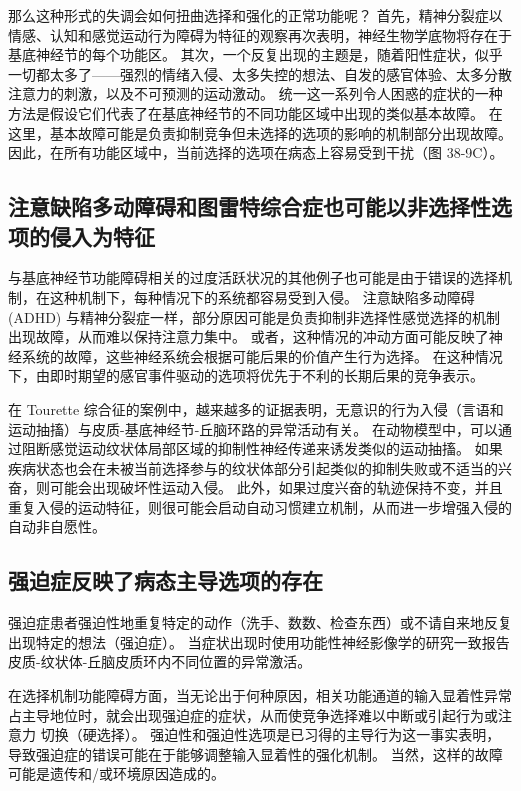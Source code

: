 那么这种形式的失调会如何扭曲选择和强化的正常功能呢？ 首先，精神分裂症以情感、认知和感觉运动行为障碍为特征的观察再次表明，神经生物学底物将存在于基底神经节的每个功能区。 其次，一个反复出现的主题是，随着阳性症状，似乎一切都太多了——强烈的情绪入侵、太多失控的想法、自发的感官体验、太多分散注意力的刺激，以及不可预测的运动激动。 统一这一系列令人困惑的症状的一种方法是假设它们代表了在基底神经节的不同功能区域中出现的类似基本故障。 在这里，基本故障可能是负责抑制竞争但未选择的选项的影响的机制部分出现故障。 因此，在所有功能区域中，当前选择的选项在病态上容易受到干扰（图 38-9C）。



\subsection{注意缺陷多动障碍和图雷特综合症也可能以非选择性选项的侵入为特征}

与基底神经节功能障碍相关的过度活跃状况的其他例子也可能是由于错误的选择机制，在这种机制下，每种情况下的系统都容易受到入侵。 注意缺陷多动障碍 (ADHD) 与精神分裂症一样，部分原因可能是负责抑制非选择性感觉选择的机制出现故障，从而难以保持注意力集中。 或者，这种情况的冲动方面可能反映了神经系统的故障，这些神经系统会根据可能后果的价值产生行为选择。 在这种情况下，由即时期望的感官事件驱动的选项将优先于不利的长期后果的竞争表示。

在 Tourette 综合征的案例中，越来越多的证据表明，无意识的行为入侵（言语和运动抽搐）与皮质-基底神经节-丘脑环路的异常活动有关。 在动物模型中，可以通过阻断感觉运动纹状体局部区域的抑制性神经传递来诱发类似的运动抽搐。 如果疾病状态也会在未被当前选择参与的纹状体部分引起类似的抑制失败或不适当的兴奋，则可能会出现破坏性运动入侵。 此外，如果过度兴奋的轨迹保持不变，并且重复入侵的运动特征，则很可能会启动自动习惯建立机制，从而进一步增强入侵的自动非自愿性。



\subsection{强迫症反映了病态主导选项的存在}
强迫症患者强迫性地重复特定的动作（洗手、数数、检查东西）或不请自来地反复出现特定的想法（强迫症）。 当症状出现时使用功能性神经影像学的研究一致报告皮质-纹状体-丘脑皮质环内不同位置的异常激活。

在选择机制功能障碍方面，当无论出于何种原因，相关功能通道的输入显着性异常占主导地位时，就会出现强迫症的症状，从而使竞争选择难以中断或引起行为或注意力 切换（硬选择）。 强迫性和强迫性选项是已习得的主导行为这一事实表明，导致强迫症的错误可能在于能够调整输入显着性的强化机制。 当然，这样的故障可能是遗传和/或环境原因造成的。

